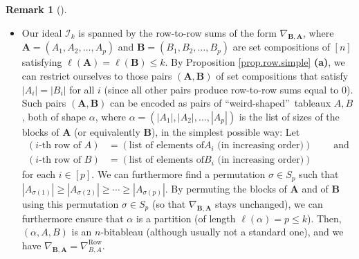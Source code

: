 \documentclass[numbers=enddot,12pt,final,onecolumn,notitlepage]{scrartcl}%
\numberwithin{exer}{subsection}
\theoremstyle{definition}
\newtheorem{remk}[theo]{Remark}
\newenvironment{remark}[1][]
{\begin{remk}[#1]\begin{leftbar}}
{\end{leftbar}\end{remk}}
\begin{document}
\begin{remark}
\begin{itemize}
\item Our ideal $\mathcal{I}_{k}$ is spanned by the row-to-row sums of the
form $\nabla_{\mathbf{B},\mathbf{A}}$, where $\mathbf{A}=\left(  A_{1}%
,A_{2},\ldots,A_{p}\right)  $ and $\mathbf{B}=\left(  B_{1},B_{2},\ldots
,B_{p}\right)  $ are set compositions of $\left[  n\right]  $ satisfying
$\ell\left(  \mathbf{A}\right)  =\ell\left(  \mathbf{B}\right)  \leq k$. By
Proposition \ref{prop.row.simple} \textbf{(a)}, we can restrict ourselves to
those pairs $\left(  \mathbf{A},\mathbf{B}\right)  $ of set compositions that
satisfy $\left\vert A_{i}\right\vert =\left\vert B_{i}\right\vert $ for all
$i$ (since all other pairs produce row-to-row sums equal to $0$). Such pairs
$\left(  \mathbf{A},\mathbf{B}\right)  $ can be encoded as pairs of
\textquotedblleft weird-shaped\textquotedblright\ tableaux $A,B$, both of
shape $\alpha$, where $\alpha=\left(  \left\vert A_{1}\right\vert ,\left\vert
A_{2}\right\vert ,\ldots,\left\vert A_{p}\right\vert \right)  $ is the list of
sizes of the blocks of $\mathbf{A}$ (or equivalently $\mathbf{B}$), in the
simplest possible way: Let%
\begin{align*}
\left(  i\text{-th row of }A\right)   &  =\left(  \text{list of elements of
}A_{i}\text{ (in increasing order)}\right)  \ \ \ \ \ \ \ \ \ \ \text{and}\\
\left(  i\text{-th row of }B\right)   &  =\left(  \text{list of elements of
}B_{i}\text{ (in increasing order)}\right)
\end{align*}
for each $i\in\left[  p\right]  $. We can furthermore find a permutation
$\sigma\in S_{p}$ such that $\left\vert A_{\sigma\left(  1\right)
}\right\vert \geq\left\vert A_{\sigma\left(  2\right)  }\right\vert \geq
\cdots\geq\left\vert A_{\sigma\left(  p\right)  }\right\vert $. By permuting
the blocks of $\mathbf{A}$ and of $\mathbf{B}$ using this permutation
$\sigma\in S_{p}$ (so that $\nabla_{\mathbf{B},\mathbf{A}}$ stays unchanged),
we can furthermore ensure that $\alpha$ is a partition (of length $\ell\left(
\alpha\right)  =p\leq k$). Then, $\left(  \alpha,A,B\right)  $ is an
$n$-bitableau (although usually not a standard one), and we have
$\nabla_{\mathbf{B},\mathbf{A}}=\nabla_{B,A}^{\operatorname*{Row}}$.


\end{itemize}
\end{remark}
\end{document}

